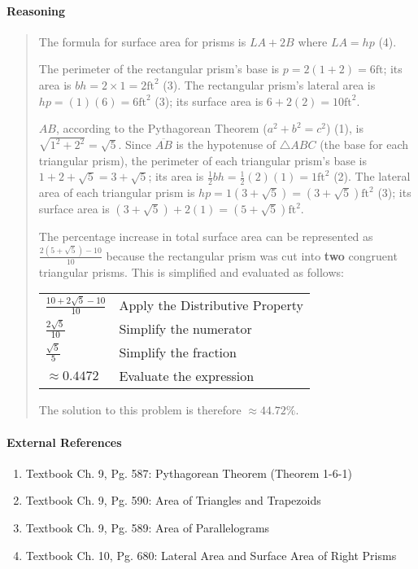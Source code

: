\documentclass[letterpaper,12pt,twoside]{report}
\begin{document}
	\paragraph{Reasoning}
	\begin{quotation}
		
		The formula for surface area for prisms is $LA+2B$ where $LA=hp$ (4).
		
		The perimeter of the rectangular prism's base is $p=2(1+2)=6 \text{ft}$; its area is $bh=2\times 1=2 \text{ft}^2$ (3). The rectangular prism's lateral area is $hp=(1)(6)=6 \text{ft}^2$ (3); its surface area is $6+2(2)=10 \text{ft}^2$.
		
		$AB$, according to the Pythagorean Theorem ($a^2+b^2=c^2$) (1), is $\sqrt{1^2+2^2}=\sqrt{5}$. Since $\overline{AB}$ is the hypotenuse of $\triangle ABC$ (the base for each triangular prism), the perimeter of each triangular prism's base is $1+2+\sqrt{5}=3+\sqrt{5}$; its area is $\frac{1}{2}bh=\frac{1}{2}(2)(1)=1 \text{ft}^2$ (2). The lateral area of each triangular prism is $hp=1(3+\sqrt{5})=(3+\sqrt{5}) \text{ft}^2$ (3); its surface area is $(3+\sqrt{5})+2(1)=(5+\sqrt{5}) \text{ft}^2$.
		
		The percentage increase in total surface area can be represented as $\frac{2(5+\sqrt{5})-10}{10}$ because the rectangular prism was cut into \textbf{two} congruent triangular prisms. This is simplified and evaluated as follows:
		
		\begin{center}
			\begin{tabular}{l | l}
				$\frac{10+2\sqrt{5}-10}{10}$ & Apply the Distributive Property \\
				$\frac{2\sqrt{5}}{10}$ & Simplify the numerator \\
				$\frac{\sqrt{5}}{5}$ & Simplify the fraction \\
				$\approx 0.4472$ & Evaluate the expression
			\end{tabular}		
		\end{center}
	
	The solution to this problem is therefore $\boxed{\approx 44.72\%}$.
	\end{quotation}
	
	\paragraph{External References}
	
	\begin{enumerate}
		\item Textbook Ch. 9, Pg. 587: Pythagorean Theorem (Theorem 1-6-1)
		\item Textbook Ch. 9, Pg. 590: Area of Triangles and Trapezoids
		\item Textbook Ch. 9, Pg. 589: Area of Parallelograms
		\item Textbook Ch. 10, Pg. 680: Lateral Area and Surface Area of Right Prisms
	\end{enumerate}
	
\end{document}
